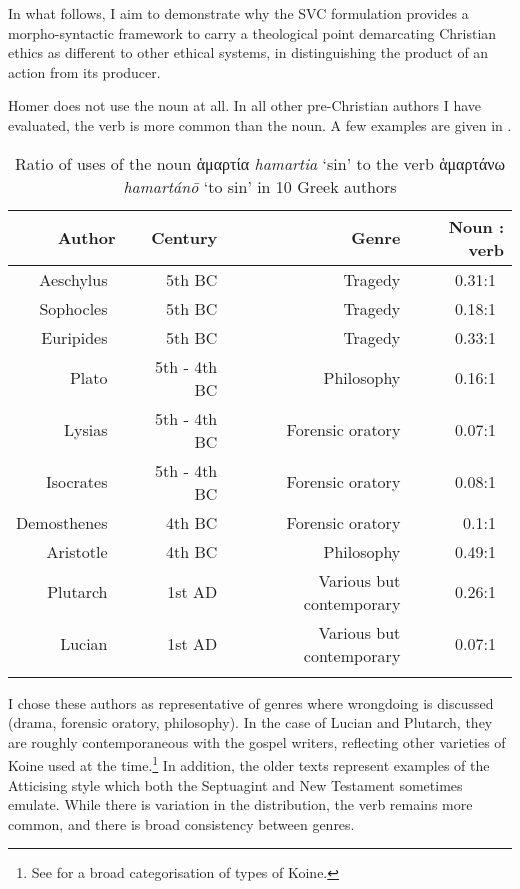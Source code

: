 \documentclass[output=paper,colorlinks,citecolor=brown]{langscibook}
\begin{document}
In what follows, I aim to demonstrate why the SVC formulation provides a
morpho-syntactic framework to carry a theological point demarcating
Christian ethics as different to other ethical systems, in
distinguishing the product of an action from its producer.


Homer does not use the noun at all. In all other pre-Christian authors I
have evaluated, the verb is more common than the noun. A few examples
are given in .

\begin{table}
\caption{Ratio of uses of the noun ἁμαρτία \textit{hamartia} ‘sin' to the verb ἁμαρτάνω \textit{hamartánō} ‘to sin'
in 10 Greek authors}
\label{tab:myname:frequenciesCR}
 \begin{tabularx}{\textwidth}{rrrr}
  \lsptoprule
            Author & Century  & Genre & Noun : verb\\
  \midrule
Aeschylus~ & 5th BC & Tragedy & 0.31:1~ \\
Sophocles~ & 5th BC & Tragedy & 0.18:1~ \\
Euripides~ & 5th BC & Tragedy & 0.33:1~ \\
Plato~ & 5th - 4th BC & Philosophy & 0.16:1~ \\
Lysias~ & 5th - 4th BC & Forensic oratory & 0.07:1~ \\
Isocrates~ & 5th - 4th BC & Forensic oratory & 0.08:1~ \\
Demosthenes~ & 4th BC & Forensic oratory & 0.1:1~ \\
Aristotle~ & 4th BC & Philosophy & 0.49:1~ \\
Plutarch~ & 1st AD & Various but contemporary & 0.26:1~ \\
Lucian~ & 1st AD & Various but contemporary & 0.07:1~ \\
  \lspbottomrule
 \end{tabularx}
\end{table}


I chose these authors as representative of genres where wrongdoing is
discussed (drama, forensic oratory, philosophy). In the case of Lucian and Plutarch, they are roughly contemporaneous with the gospel writers, reflecting other varieties of Koine used at the time.\footnote {See \citet{horrocks_greek_2010} for a broad categorisation of types of Koine.}
In addition, the older texts represent examples of the Atticising style which both the Septuagint and New Testament sometimes emulate. 
While there is
variation in the distribution, the verb remains more common, and there
is broad consistency between genres.
\end{document}
